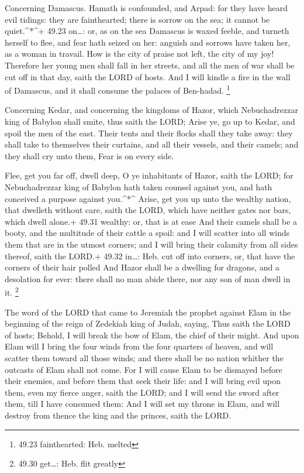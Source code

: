 Concerning Damascus. Hamath is confounded, and Arpad: for
they have heard evil tidings: they are fainthearted; there is sorrow on
the sea; it cannot be quiet.\^{}*\^{}+ 49.23 on\ldots: or, as on the sea
 Damascus is waxed feeble, and turneth herself to flee, and
fear hath seized on her: anguish and sorrows have taken her, as a woman
in travail.  How is the city of praise not left, the city
of my joy!  Therefore her young men shall fall in her
streets, and all the men of war shall be cut off in that day, saith the
LORD of hosts.  And I will kindle a fire in the wall of
Damascus, and it shall consume the palaces of Ben-hadad. \footnote{49.23
  fainthearted: Heb. melted}

 Concerning Kedar, and concerning the kingdoms of Hazor,
which Nebuchadrezzar king of Babylon shall smite, thus saith the LORD;
Arise ye, go up to Kedar, and spoil the men of the east. 
Their tents and their flocks shall they take away: they shall take to
themselves their curtains, and all their vessels, and their camels; and
they shall cry unto them, Fear is on every side.

 Flee, get you far off, dwell deep, O ye inhabitants of
Hazor, saith the LORD; for Nebuchadrezzar king of Babylon hath taken
counsel against you, and hath conceived a purpose against you.\^{}*\^{}
 Arise, get you up unto the wealthy nation, that dwelleth
without care, saith the LORD, which have neither gates nor bars, which
dwell alone.+ 49.31 wealthy: or, that is at ease  And their
camels shall be a booty, and the multitude of their cattle a spoil: and
I will scatter into all winds them that are in the utmost corners; and I
will bring their calamity from all sides thereof, saith the LORD.+ 49.32
in\ldots: Heb. cut off into corners, or, that have the corners of their
hair polled  And Hazor shall be a dwelling for dragons, and
a desolation for ever: there shall no man abide there, nor any son of
man dwell in it. \footnote{49.30 get\ldots: Heb. flit greatly}

 The word of the LORD that came to Jeremiah the prophet
against Elam in the beginning of the reign of Zedekiah king of Judah,
saying,  Thus saith the LORD of hosts; Behold, I will break
the bow of Elam, the chief of their might.  And upon Elam
will I bring the four winds from the four quarters of heaven, and will
scatter them toward all those winds; and there shall be no nation
whither the outcasts of Elam shall not come.  For I will
cause Elam to be dismayed before their enemies, and before them that
seek their life: and I will bring evil upon them, even my fierce anger,
saith the LORD; and I will send the sword after them, till I have
consumed them:  And I will set my throne in Elam, and will
destroy from thence the king and the princes, saith the LORD.

